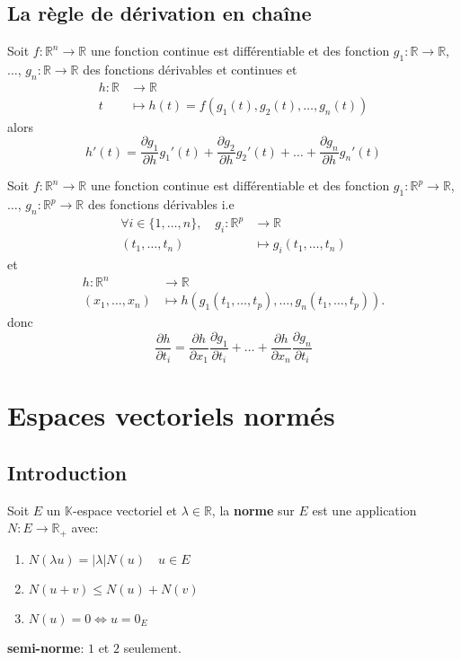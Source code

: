 \documentclass[a4paper]{report}
\newcommand\R{\ensuremath{\mathbb{R}}}
\let\iff\Leftrightarrow
\theoremstyle{definition}
\begin{document}
\section{La règle de dérivation en chaîne}

\begin{definition}
Soit $f: \R^n \to \R$ une fonction continue est différentiable et des fonction $g_1: \R \to \R$, $\ldots$, $g_n: \R \to \R$ des fonctions dérivables et continues et  
\begin{align*}
    h: \R &\longrightarrow \R \\
    t &\longmapsto h(t) = f(g_1(t), g_2(t), \ldots, g_n(t))
\end{align*}
alors 
\[
h'(t) = \frac{\partial g_1}{\partial h}g_1'(t) + \frac{\partial g_2}{\partial h}g_2'(t) + \ldots + \frac{\partial g_n}{\partial h}g_n'(t)
\] 
\end{definition}

\begin{definition}
Soit $f: \R^n \to \R$ une fonction continue est différentiable et des fonction $g_1: \R^p \to \R$, $\ldots$, $g_n: \R^p \to \R$ des fonctions dérivables 
i.e 
\begin{align*}
    \forall i \in \{ 1, \ldots, n\}, \quad
    g_i : \R^p &\longrightarrow \R \\
    (t_1, \ldots, t_n)&\longmapsto g_i(t_1, \ldots, t_n) 
\end{align*}
et  
\begin{align*}
    h: \R^n &\longrightarrow \R \\
    (x_1, \ldots, x_n) &\longmapsto h(g_1(t_1, \ldots, t_p), \ldots, g_n(t_1, \ldots, t_p)) 
.\end{align*}
donc 
\[
\frac{\partial h}{\partial t_i} = \frac{\partial h}{\partial x_1}\frac{\partial g_1}{\partial t_i} + \ldots + \frac{\partial h}{\partial x_n}\frac{\partial g_n}{\partial t_i}
\] 
\end{definition}
% 
\chapter{Espaces vectoriels normés}
\section{Introduction}
\begin{definition}
    Soit $E$ un  $\mathbb{K}$-espace vectoriel et $\lambda \in \R$, la \textbf{norme} sur  $E$ est une application $N: E \to \R_{+}$ avec:
    \begin{enumerate}
        \item $N(\lambda u) = |\lambda|N(u) \quad u \in E$
        \item $N(u + v) \le N(u) + N(v)$
        \item $N(u) = 0 \iff u = 0_{E}$
    \end{enumerate}
    \textbf{semi-norme}: $1$ et  $2$ seulement.
\end{definition}
\end{document}
